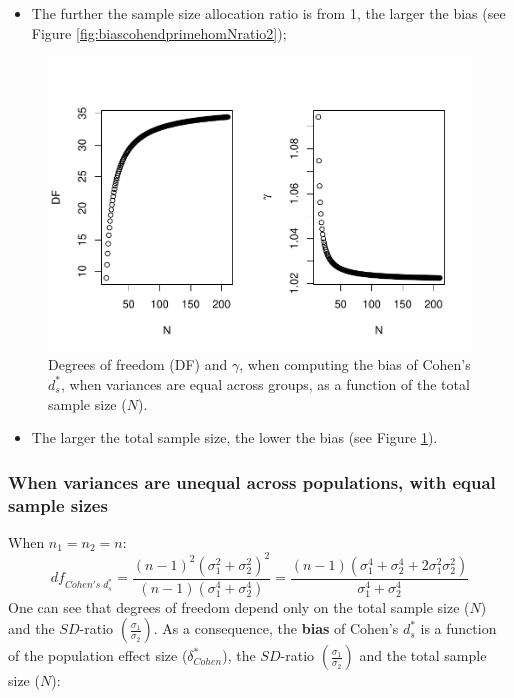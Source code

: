 \documentclass[
  english,
  man]{apa6}
\providecommand{\tightlist}{%
  \setlength{\itemsep}{0pt}\setlength{\parskip}{0pt}}
\begin{document}
\begin{itemize}
\tightlist
\item
  The further the sample size allocation ratio is from 1, the larger the bias (see Figure \ref{fig:biascohendprimehomNratio2});
\end{itemize}

\begin{figure}
\centering
\includegraphics{Theoretical-Bias-of-all-estimators-as-a-function-of-population-parameters_files/figure-latex/biascohendprimehomNsize2-1.pdf}
\caption{\label{fig:biascohendprimehomNsize2}Degrees of freedom (DF) and \(\gamma\), when computing the bias of Cohen's \(d^*_s\), when variances are equal across groups, as a function of the total sample size (\(N\)).}
\end{figure}

\begin{itemize}
\tightlist
\item
  The larger the total sample size, the lower the bias (see Figure \ref{fig:biascohendprimehomNsize2}).
\end{itemize}

\hypertarget{when-variances-are-unequal-across-populations-with-equal-sample-sizes}{%
\subsubsection{When variances are unequal across populations, with equal sample sizes}\label{when-variances-are-unequal-across-populations-with-equal-sample-sizes}}

When \(n_1 = n_2 = n\):
\[df_{Cohen's \; d^*_s} = \frac{(n-1)^2(\sigma^2_1+\sigma^2_2)^2}{(n-1)(\sigma^4_1+\sigma^4_2)} =  \frac{(n-1)(\sigma^4_1+\sigma^4_2+2\sigma^2_1\sigma^2_2)}{\sigma^4_1+\sigma^4_2}\]
One can see that degrees of freedom depend only on the total sample size (\(N\)) and the \(SD\)-ratio \(\left( \frac{\sigma_1}{\sigma_2}\right)\). As a consequence, the \textbf{bias} of Cohen's \(d^*_s\) is a function of the population effect size (\(\delta^*_{Cohen}\)), the \(SD\)-ratio \(\left( \frac{\sigma_1}{\sigma_2}\right)\) and the total sample size (\(N\)):
\end{document}
